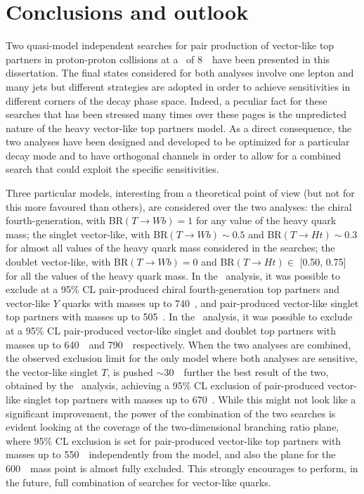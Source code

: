 \clearpage{\pagestyle{empty}\cleardoublepage}

\chapter*{Conclusions and outlook}\label{chap:conclusions}

Two quasi-model independent searches for 
pair production of vector-like top partners 
in proton-proton collisions at a \cme\ of 8~\tev\ 
have been presented in this dissertation. The final states considered
for both analyses involve one lepton and many jets but different
strategies are adopted in order to achieve sensitivities in different
corners of the decay phase space. Indeed, a peculiar fact for these
searches that has been stressed many times over these pages is the 
unpredicted nature of the heavy vector-like top partners model. 
As a direct consequence, the two analyses have been designed
and developed to be optimized for a particular decay mode and
to have orthogonal channels in order to allow
for a combined search that could exploit the specific sensitivities.

Three particular models, interesting from a theoretical point
of view (but not for this more favoured than others), are considered
over the two analyses: the chiral fourth-generation, with 
BR$(T\to Wb)=1$ for any value of the heavy quark mass; 
the singlet vector-like, with BR$(T\to Wb)\sim 0.5$ and 
BR$(T\to Ht)\sim 0.3$ for almost all
values of the heavy quark mass considered in the searches;
the doublet vector-like, with BR$(T\to Wb)= 0$ and 
BR$(T\to Ht)\in$ [0.50, 0.75] for all the values of the heavy quark mass.
In the \wbx\ analysis, it was possible to exclude at a 95\% CL
pair-produced chiral fourth-generation top partners and vector-like
$Y$ quarks with masses up to 740~\gev, and pair-produced vector-like 
singlet top partners with  masses up to 505~\gev.
In the \htx\ analysis, it was possible to exclude at a 95\% CL
pair-produced vector-like singlet and doublet top partners with 
masses up to 640~\gev\ and 790~\gev\ respectively.
When the two analyses are combined, the observed exclusion limit
for the only model where both analyses are sensitive, the
vector-like singlet $T$, is pushed $\sim$30~\gev\ further the
best result of the two, obtained by the \htx\ analysis,
achieving a 95\% CL exclusion of pair-produced vector-like singlet 
top partners with masses up to 670~\gev. While this might not
look like a significant improvement, the power of the combination
of the two searches is evident looking at the coverage of the
two-dimensional branching ratio plane, where  95\% CL exclusion is set for
pair-produced vector-like top partners with masses up to 550~\gev\ 
independently from the model, and also the plane for the 600~\gev\ mass
point is almost fully excluded. This strongly encourages to perform,
in the future, full combination of searches for vector-like quarks.

